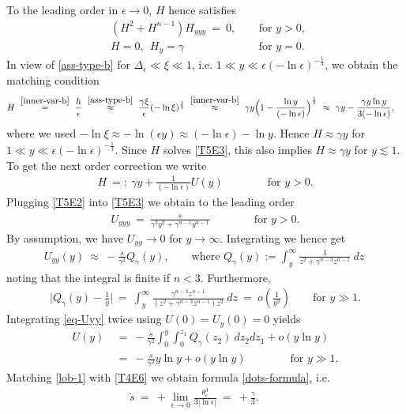 \documentclass[pagesize,pdftex]{amsart}
\newcommand{\gam}{\gamma}
\newcommand{\eps}{\epsilon}
\newcommand{\ang}{\theta}
\newcommand{\lupref}[2]{\hspace{0ex} \stackrel{\eqref{#1}}{#2}} %
\begin{document}
To the leading order in $\eps \to 0$, $H$ hence satisfies
\begin{align}
  &(H^2+H^{n-1})H_{yyy} \ = \  0,\ \ &&\text{for $y > 0$},\ \\
  &H=0,\ \ H_{y} = \gam \ \ \ &&\text{for $y=0$.} \label{eq-H2} %
\end{align}
In view of \eqref{ass-type-b} for $\Delta_\eps \ll \xi \ll 1$, i.e.
$1 \ll y \ll \eps (-\ln \eps)^{-\frac 13}$, we obtain the matching condition
\begin{align} \label{T4E6} %
  H \ %
  \lupref{inner-var-b}= \ \frac h\eps \ %
  &\lupref{ass-type-b}\approx \ \frac{\gam \xi}\eps (- \ln \xi)^{\frac 13} \ %
    \lupref{inner-var-b}\approx \ \gam y \Big( 1 - \frac{\ln y}{(-\ln \eps)} \Big)^{\frac 13} \ %
    \approx \ \gam y - \frac{\gam y \ln y}{3(-\ln \eps)}, %
\end{align}%
where we used $-\ln \xi \approx -\ln (\eps y) \approx (-\ln \eps) - \ln y$.
Hence $H\approx \gam y$ for $1 \ll y \ll \eps (-\ln \eps)^{-\frac 13}$. Since
$H$ solves \eqref{T5E3}, this also implies $H\approx \gam y$ for $y \lesssim 1$.  To
get the next order correction we write
\begin{align}
  H  \ %
  =: \ \gam y+ \frac 1{(-\ln \eps)}U(y)  \qquad\qquad %
  \text{for $y > 0$.} \label{T5E2}
\end{align}%
Plugging \eqref{T5E2} into \eqref{T5E3} we obtain to the leading order %
\begin{align}
  U_{yyy} \ = \ \frac {\dot s}{\gam^2 y^2+ \gam^{n-1} y^{n-1}} \qquad\qquad %
  \text{for $y > 0$}.
\end{align}%
By assumption, we have $U_{yy} \to 0$ for $y \to \infty$. Integrating we hence
get
\begin{align} \label{eq-Uyy} %
  U_{yy}(y) \ %
  \approx \ - \frac {\dot s}{\gam^2} Q_\gam(y), \qquad
  \text{where } Q_\gam(y) :=  \int_{y}^{\infty }\frac 1{z^2+ \gam^{n-3}z^{n-1}} \ dz \ %
\end{align}
noting that the integral is finite if $n < 3$. Furthermore, 
\begin{align} \label{lob-3} %
  \Big|Q_{\gam }(y) - \frac 1{y} \Big| \ %
  = \ \int_{y}^{\infty }\frac {\gam^{n-3}z^{n-1}}{(z^2+ \gam^{n-3}z^{n-1})z^2} \
  dz \ %
  = \ o(\frac 1{y^2}) \qquad 
  \text{for  $y \gg 1$.}
\end{align}
Integrating \eqref{eq-Uyy} twice using $U(0) = U_y(0) = 0$ yields%
\begin{align} \label{lob-1} %
  U(y) \ %
  &= \ - \frac {\dot s}{\gam^2}\int_{0}^{y}\int_{0}^{z_1}Q_{\gam}(z_2) \ dz_2dz_1+ o(y \ln y) \\
  &= \ - \frac {\dot s}{\gam^2}y\ln y + o(y \ln y) %
  \qquad\qquad \text{for $y\gg 1$}.
\end{align}%
Matching \eqref{lob-1} with \eqref{T4E6} we obtain formula \eqref{dots-formula},
i.e.
\begin{align} \label{dots-formula2} %
  \dot s \ %
  = \   + \lim_{\eps \to 0} \frac {\ang_\eps^3}{3|\ln \eps|} \ %
  = \  + \frac \gam 3. \qquad %
\end{align}
\end{document}
